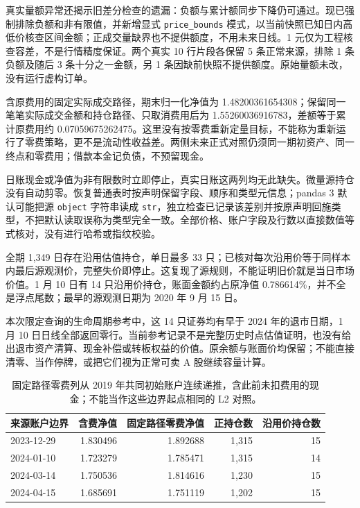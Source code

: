 真实量额异常还揭示旧差分检查的遗漏：负额与累计额同步下降仍可通过。现已强制排除负额和非有限值，并新增显式 \texttt{price\_bounds} 模式，以当前快照已知日内高低价核查区间金额；正成交量缺界也不提供额度，不用未来日线。1 元仅为工程核查容差，不是行情精度保证。两个真实 10 行片段各保留 5 条正常来源，排除 1 条负额及随后 3 条十分之一金额，另 1 条因缺前快照不提供额度。原始量额未改，没有运行虚构订单。

含原费用的固定实际成交路径，期末归一化净值为 1.48200361654308；保留同一笔笔实际成交金额和持仓路径、只取消费用后为 1.55260036916783，差额等于累计原费用约 0.07059675262475。这里没有按零费重新定量目标，不能称为重新运行了零费策略，更不是流动性收益差。两侧未来正式对照仍须同一期初资产、同一终点和零费用；借款本金记负债，不预留现金。

日账现金或净值为非有限数时立即停止，真实日账这两列均无此缺失。微量源持仓没有自动剪零。恢复普通表时按声明保留字段、顺序和类型元信息；pandas 3 默认可能把源 \texttt{object} 字符串读成 \texttt{str}，独立检查已记录该差别并按原声明回施类型，不把默认读取误称为类型完全一致。全部价格、账户字段及行数以直接数值等式核对，没有进行哈希或指纹校验。

\clearpage
{}

全期 1,349 日存在沿用估值持仓，单日最多 33 只；已核对每次沿用价等于同样本内最后源观测价，完整失价即停止。这复现了源规则，不能证明旧价就是当日市场价值。1 月 10 日有 14 只沿用价持仓，账面金额约占原净值 0.786614\%，并不全是浮点尾数；最早的源观测日期为 2020 年 9 月 15 日。

本次限定查询的生命周期参考中，这 14 只证券均有早于 2024 年的退市日期，1 月 10 日日线全部返回零行。当前参考记录不是完整历史时点估值证明，也没有给出退市资产清算、现金补偿或转板权益的价值。原余额与账面价均保留；不能直接清零、当作停牌，或把它们视为正常可卖 A 股继续容量计算。

\begin{table}[H]\centering\small
\begin{tabular}{lrrrr}
\toprule 来源账户边界 & 含费净值 & 固定路径零费净值 & 正持仓数 & 沿用价持仓数\\\midrule
2023-12-29 & 1.830496 & 1.892688 & 1,315 & 15\\
2024-01-10 & 1.723279 & 1.785471 & 1,315 & 14\\
2024-03-14 & 1.750536 & 1.814616 & 1,230 & 15\\
2024-04-15 & 1.685691 & 1.751119 & 1,202 & 15\\
\bottomrule
\end{tabular}
\caption{固定路径零费列从 2019 年共同初始账户连续递推，含此前未扣费用的现金；不能当作这些边界起点相同的 L2 对照。}
\end{table}

